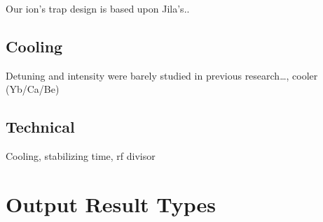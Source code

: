 
Our ion's trap design is based upon Jila's..

\subsection{Cooling}\label{cooling}

Detuning and intensity were barely studied in previous research\ldots,
cooler (Yb/Ca/Be)


\subsection{Technical}\label{technical}

Cooling, stabilizing time, rf divisor


\section{Output Result Types}\label{output-result-types}


